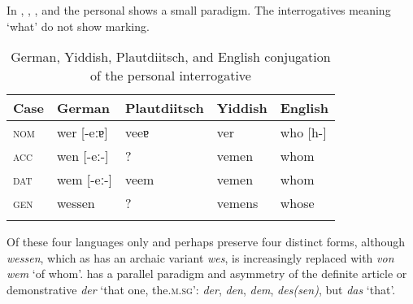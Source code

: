 In , , , and  the personal  shows a small paradigm. The interrogatives meaning ‘what’ do not show  marking.

\begin{table}
\caption{German, Yiddish, Plautdiitsch, and English conjugation of the personal interrogative}
\label{tab:indo:8}

\begin{tabularx}{\textwidth}{XXXXl}
\lsptoprule

\textbf{Case} & \textbf{German} & \textbf{Plautdiitsch} & \textbf{Yiddish} & \textbf{English}\\
\midrule
\textsc{nom} & wer [-eːɐ] & veeɐ & ver & who [h-]\\
\textsc{acc} & wen [-eː-] & ? & vemen & whom\\
\textsc{dat} & wem [-eː-] & veem & vemen & whom\\
\textsc{gen} & wessen & ? & vemens & whose\\
\lspbottomrule
\end{tabularx}
\end{table}

Of these four languages only  and perhaps  preserve four distinct forms, although  \textit{wessen}, which as has an archaic variant \textit{wes}, is increasingly replaced with \textit{von wem} ‘of whom’.  has a parallel paradigm and asymmetry of the definite article or demonstrative \textit{der} ‘that one, the.\textsc{m.sg}’: \textit{der}, \textit{den}, \textit{dem}, \textit{des(sen)}, but \textit{das} ‘that’.

